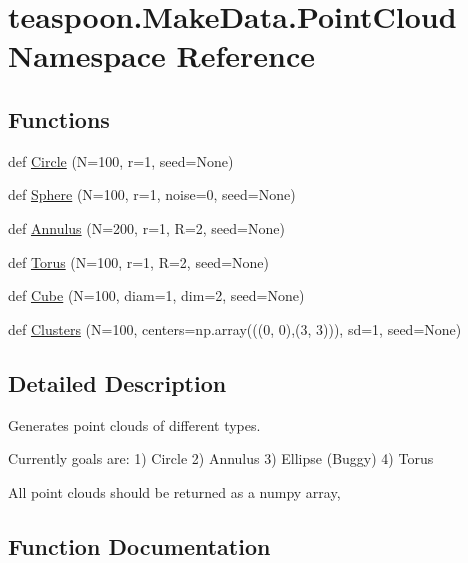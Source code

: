\hypertarget{namespaceteaspoon_1_1_make_data_1_1_point_cloud}{}\section{teaspoon.\+Make\+Data.\+Point\+Cloud Namespace Reference}
\label{namespaceteaspoon_1_1_make_data_1_1_point_cloud}
\subsection*{Functions}
\begin{DoxyCompactItemize}
\item 
def \hyperlink{namespaceteaspoon_1_1_make_data_1_1_point_cloud_a89af9aed6706a0a5ee9a2cbeec801db2}{Circle} (N=100, r=1, seed=None)
\item 
def \hyperlink{namespaceteaspoon_1_1_make_data_1_1_point_cloud_af130e51668240f775bca4ff195be2bea}{Sphere} (N=100, r=1, noise=0, seed=None)
\item 
def \hyperlink{namespaceteaspoon_1_1_make_data_1_1_point_cloud_a3720c7f39eecd56c7e4375cc0feef4ed}{Annulus} (N=200, r=1, R=2, seed=None)
\item 
def \hyperlink{namespaceteaspoon_1_1_make_data_1_1_point_cloud_a85b2e43a1f8feda494c13d9c8537c0a2}{Torus} (N=100, r=1, R=2, seed=None)
\item 
def \hyperlink{namespaceteaspoon_1_1_make_data_1_1_point_cloud_ad2738d11d9b3018aab5d163587239518}{Cube} (N=100, diam=1, dim=2, seed=None)
\item 
def \hyperlink{namespaceteaspoon_1_1_make_data_1_1_point_cloud_a130af3abbe5cb02a99c3f64d3f3dd979}{Clusters} (N=100, centers=np.\+array(((0, 0),(3, 3))), sd=1, seed=None)
\end{DoxyCompactItemize}


\subsection{Detailed Description}
\begin{DoxyVerb}Generates point clouds of different types.  

Currently goals are:
1) Circle
2) Annulus
3) Ellipse (Buggy)
4) Torus

All point clouds should be returned as a numpy array, 
\end{DoxyVerb}
 

\subsection{Function Documentation}
